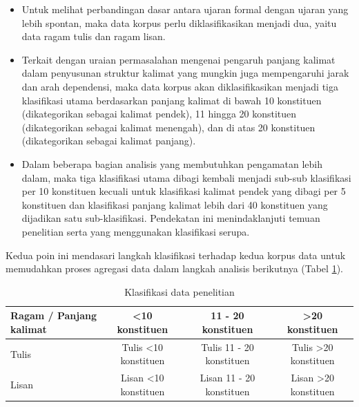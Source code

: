 \begin{itemize}
	\item Untuk melihat perbandingan dasar antara ujaran formal dengan ujaran yang lebih spontan, maka data korpus perlu diklasifikasikan menjadi dua, yaitu data ragam tulis dan ragam lisan.
	\item Terkait dengan uraian permasalahan mengenai pengaruh panjang kalimat dalam penyusunan struktur kalimat yang mungkin juga mempengaruhi jarak dan arah dependensi, maka data korpus akan diklasifikasikan menjadi tiga klasifikasi utama berdasarkan panjang kalimat di bawah 10 konstituen (dikategorikan sebagai kalimat pendek), 11 hingga 20 konstituen (dikategorikan sebagai kalimat menengah), dan di atas 20 konstituen (dikategorikan sebagai kalimat panjang).
	\item Dalam beberapa bagian analisis yang membutuhkan pengamatan lebih dalam, maka tiga klasifikasi utama dibagi kembali menjadi sub-sub klasifikasi per 10 konstituen kecuali untuk klasifikasi kalimat pendek yang dibagi per 5 konstituen dan klasifikasi panjang kalimat lebih dari 40 konstituen yang dijadikan satu sub-klasifikasi. Pendekatan ini menindaklanjuti temuan penelitian \cite{oya2011syntactic} serta \cite{jiang2015effects} yang menggunakan klasifikasi serupa. 
\end{itemize}

Kedua poin ini mendasari langkah klasifikasi terhadap kedua korpus data untuk memudahkan proses agregasi data dalam langkah analisis berikutnya (Tabel \ref{tab:tabel_klasifikasi_data}). 

\begin{table}
\begin{footnotesize}
\begin{center}
  \caption{Klasifikasi data penelitian}\label{tab:tabel_klasifikasi_data}
  \begin{tabular}{ | p{3cm} | c | c | c |}
    \hline
    Ragam / Panjang kalimat & \textless 10 konstituen & 11 - 20 konstituen & \textgreater 20 konstituen \\ \hline
    Tulis & Tulis \textless 10 konstituen & Tulis 11 - 20 konstituen & Tulis \textgreater 20 konstituen  \\ \hline
    Lisan & Lisan \textless 10 konstituen & Lisan 11 - 20 konstituen & Lisan \textgreater 20 konstituen \\
    \hline
  \end{tabular}
\end{center}
\end{footnotesize}
\end{table}

